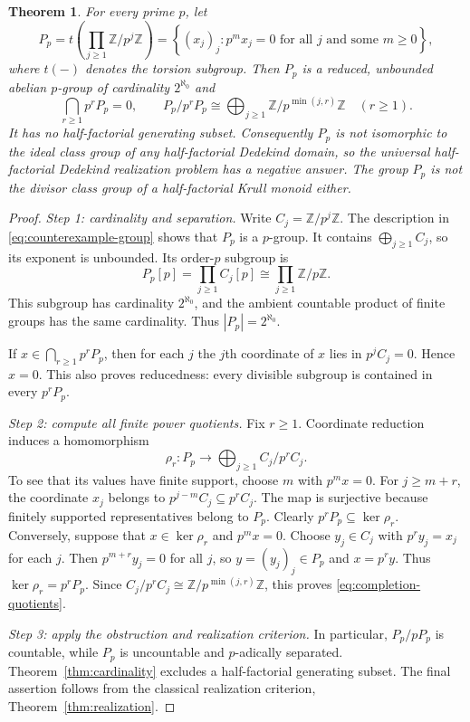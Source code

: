 \documentclass[11pt,reqno]{amsart}
\numberwithin{equation}{section}
\newtheorem{theorem}{Theorem}[section]
\theoremstyle{definition}
\theoremstyle{remark}
\newcommand{\Z}{\mathbb Z}
\begin{document}
\begin{theorem}\label{thm:counterexample}
For every prime $p$, let
\begin{equation}\label{eq:counterexample-group}
 P_p=t\!\left(\prod_{j\ge1}\Z/p^j\Z\right)
 =\left\{(x_j)_j:
       p^m x_j=0\text{ for all }j\text{ and some }m\ge0\right\},
\end{equation}
where $t(-)$ denotes the torsion subgroup. Then $P_p$ is a reduced,
unbounded abelian $p$-group of cardinality $2^{\aleph_0}$ and
\begin{equation}\label{eq:completion-quotients}
 \bigcap_{r\ge1}p^rP_p=0,\qquad
 P_p/p^rP_p\cong
 \bigoplus_{j\ge1}\Z/p^{\min(j,r)}\Z
 \quad(r\ge1).
\end{equation}
It has no half-factorial generating subset. Consequently $P_p$ is
not isomorphic to the ideal class group of any half-factorial
Dedekind domain, so the universal half-factorial Dedekind realization problem
has a negative answer. The group $P_p$ is not the divisor class
group of a half-factorial Krull monoid either.
\end{theorem}

\begin{proof}
\emph{Step 1: cardinality and separation.}
Write $C_j=\Z/p^j\Z$. The description in
\eqref{eq:counterexample-group} shows that $P_p$ is a $p$-group.
It contains $\bigoplus_{j\ge1}C_j$, so its exponent is unbounded.
Its order-$p$ subgroup is
\[
 P_p[p]=\prod_{j\ge1}C_j[p]\cong\prod_{j\ge1}\Z/p\Z.
\]
This subgroup has cardinality $2^{\aleph_0}$, and the ambient
countable product of finite groups has the same cardinality.
Thus $|P_p|=2^{\aleph_0}$.

If $x\in\bigcap_{r\ge1}p^rP_p$, then for each $j$ the
$j$th coordinate of $x$ lies in $p^jC_j=0$. Hence $x=0$.
This also proves reducedness: every divisible subgroup is contained
in every $p^rP_p$.

\emph{Step 2: compute all finite power quotients.}
Fix $r\ge1$. Coordinate reduction induces a homomorphism
\[
 \rho_r:P_p\longrightarrow\bigoplus_{j\ge1}C_j/p^rC_j.
\]
To see that its values have finite support, choose $m$ with $p^mx=0$.
For $j\ge m+r$, the coordinate $x_j$ belongs to
$p^{j-m}C_j\subseteq p^rC_j$. The map is surjective because
finitely supported representatives belong to $P_p$.
Clearly $p^rP_p\subseteq\ker\rho_r$. Conversely, suppose that
$x\in\ker\rho_r$ and $p^mx=0$. Choose $y_j\in C_j$ with
$p^ry_j=x_j$ for each $j$. Then $p^{m+r}y_j=0$ for all $j$,
so $y=(y_j)_j\in P_p$ and $x=p^ry$. Thus
$\ker\rho_r=p^rP_p$. Since
$C_j/p^rC_j\cong\Z/p^{\min(j,r)}\Z$, this proves
\eqref{eq:completion-quotients}.

\emph{Step 3: apply the obstruction and realization criterion.}
In particular, $P_p/pP_p$ is countable, while $P_p$ is uncountable
and $p$-adically separated. Theorem~\ref{thm:cardinality} excludes
a half-factorial generating subset. The final assertion follows
from the classical realization criterion,
Theorem~\ref{thm:realization}.
\end{proof}
\end{document}
